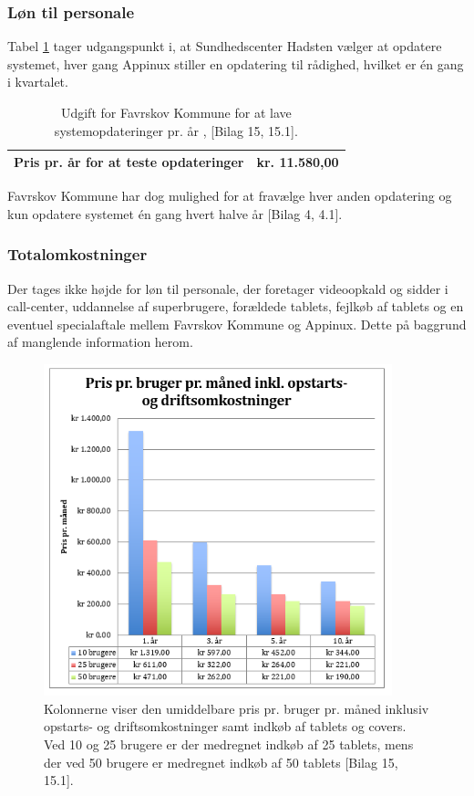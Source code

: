 \subsubsection{Løn til personale}
Tabel \ref{tab:tabelpersonaleudgift} tager udgangspunkt i, at Sundhedscenter Hadsten vælger at opdatere systemet, hver gang Appinux stiller en opdatering til rådighed, hvilket er én gang i kvartalet. 

\begin{table}[H]
	\caption{Udgift for Favrskov Kommune for at lave systemopdateringer pr. år \cite{dsr}, [Bilag 15, 15.1].} 
	\centering
	\label{tab:tabelpersonaleudgift}
	\begin{tabularx}{\textwidth}{|X|X|}
		\hline
		Pris pr. år for at teste opdateringer
		& kr. 11.580,00\\ 
		\hline
	\end{tabularx}
\end{table}

Favrskov Kommune har dog mulighed for at fravælge hver anden opdatering og kun opdatere systemet én gang hvert halve år [Bilag 4, 4.1].

\subsubsection{Totalomkostninger}
Der tages ikke højde for løn til personale, der foretager videoopkald og sidder i call-center, uddannelse af superbrugere, forældede tablets, fejlkøb af tablets og en eventuel specialaftale mellem Favrskov Kommune og Appinux. Dette på baggrund af manglende information herom.

\begin{figure}[H]
	\centering
	\includegraphics[width=0.9\textwidth]{Figurer/figuroko.png}
	\caption{\label{fig:oekokort}Kolonnerne viser den umiddelbare pris pr. bruger pr. måned inklusiv opstarts- og driftsomkostninger samt indkøb af tablets og covers.
		Ved 10 og 25 brugere er der medregnet indkøb af 25 tablets, mens der ved 50 brugere er medregnet indkøb af 50 tablets [Bilag 15, 15.1].}
\end{figure}

